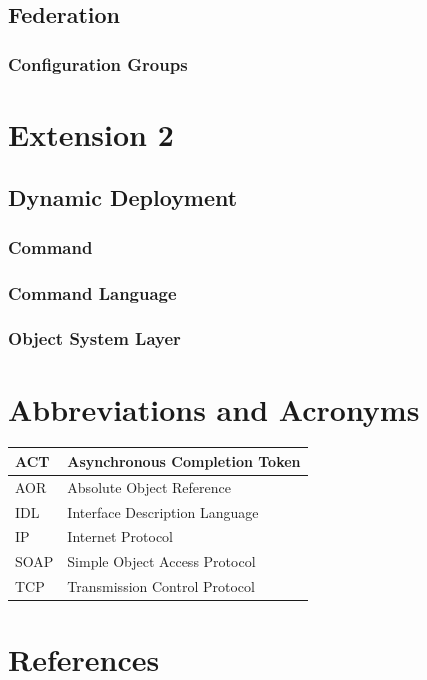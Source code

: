 \documentclass[a4paper]{article}
\begin{document}
\subsection{Federation}
\subsubsection{Configuration Groups}

\section{Extension 2}
\subsection{Dynamic Deployment}
\subsubsection{Command}
\subsubsection{Command Language}
\subsubsection{Object System Layer}

\clearpage
\appendix
\section{Abbreviations and Acronyms}
\vspace{0.5cm}
	\begin{tabular}{|l|l|}
	\hline
	ACT & Asynchronous Completion Token\\
	\hline
	AOR & Absolute Object Reference\\
	\hline
	IDL & Interface Description Language\\
	\hline
	IP & Internet Protocol\\
	\hline
	SOAP & Simple Object Access Protocol\\
	\hline
	TCP & Transmission Control Protocol\\
	\hline
	\end{tabular}

\vspace{1cm}

\section{References}
\renewcommand{\refname}{}
\vspace{-1cm}


\end{document}
